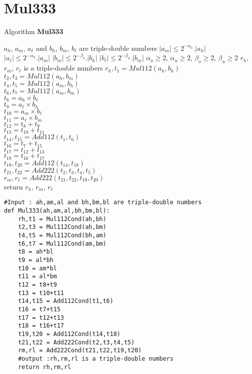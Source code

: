 \section*{Mul333}
\begin{algorithm}[htbp]
  \caption{Algorithm \textbf{Mul333}}
\begin{algorithmic}[1]
\Input $a_h$, $a_m$, $a_{\ell}$ and $b_h$, $b_m$, $b_{\ell}$ are triple-double numbers
\Condition $\lvert a_m \rvert \le 2^{-\alpha_o} .\lvert a_h \rvert$
\Condition $\lvert a_{\ell} \rvert \le 2^{-\alpha_u} .\lvert a_m \rvert$
\Condition $\lvert b_m \rvert \le 2^{-\beta_o} .\lvert b_h \rvert$
\Condition $\lvert b_{\ell} \rvert \le 2^{-\beta_u} .\lvert b_m \rvert$
\Condition $\alpha_o \ge 2$, $\alpha_u \ge 2$, $\beta_o \ge 2$, $\beta_u \ge 2$
\Output $r_h$, $r_m$, $r_{\ell}$ is a triple-double numbers
\State $r_h,t_1 = Mul112(a_h,b_h)$\\
    $t_2,t_3 = Mul112(a_h,b_m)$\\
    $t_4,t_5 = Mul112(a_m,b_h)$\\
    $t_6,t_7 = Mul112(a_m,b_m)$\\
    $t_8 = a_h\times b_{\ell}$\\
    $t_9 = a_{\ell}\times b_h$\\
    $t_{10} = a_m\times b_{\ell}$\\
    $t_{11} = a_{\ell}\times b_m$\\ 
    $t_{12} = t_8+t_9$\\
    $t_{13} = t_{10}+ t_{11}$\\
    $t_{14},t_{15} = Add112(t_1,t_6)$\\
    $t_{16} = t_7+t_{15}$\\
    $t_{17} = t_{12}+t_{13}$\\
    $t_{18} = t_{16}+t_{17}$\\
    $t_{19},t_{20} = Add112(t_{14},t_{18})$\\
    $t_{21},t_{22} = Add222(t_2,t_3,t_4,t_5)$\\
    $r_m,r_{\ell} = Add222(t_{21},t_{22},t_{19},t_{20})$\\
    return $r_h$, $r_m$, $r_{\ell}$
\end{algorithmic}
\label{algo:Mul333}
\end{algorithm}


\begin{lstlisting}
#Input : ah,am,al and bh,bm,bl are triple-double numbers
def Mul333(ah,am,al,bh,bm,bl):
    rh,t1 = Mul112Cond(ah,bh)
    t2,t3 = Mul112Cond(ah,bm)
    t4,t5 = Mul112Cond(bh,am)
    t6,t7 = Mul112Cond(am,bm)
    t8 = ah*bl
    t9 = al*bh
    t10 = am*bl
    t11 = al*bm 
    t12 = t8+t9
    t13 = t10+t11
    t14,t15 = Add112Cond(t1,t6)
    t16 = t7+t15
    t17 = t12+t13
    t18 = t16+t17
    t19,t20 = Add112Cond(t14,t18)
    t21,t22 = Add222Cond(t2,t3,t4,t5)
    rm,rl = Add222Cond(t21,t22,t19,t20)
    #output :rh,rm,rl is a triple-double numbers
    return rh,rm,rl
\end{lstlisting}

